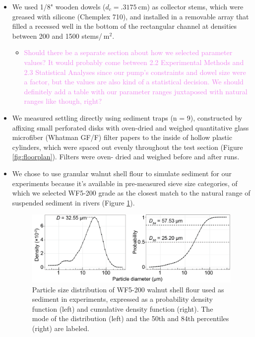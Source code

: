 \documentclass{article}
\begin{document}
\begin{itemize}
    \item We used 1/8" wooden dowels ($d_c = \SI{.3175}{\centi\metre}$) as collector stems, which were greased with silicone (Chemplex 710), and installed in a removable array that filled a recessed well in the bottom of the rectangular channel at densities between 200 and 1500 stems/$\SI{}{\metre^2}$.
    \begin{itemize}
        \item \textcolor{violet}{Should there be a separate section about how we selected parameter values? It would probably come between 2.2 Experimental Methods and 2.3 Statistical Analyses since our pump's constraints and dowel size were a factor, but the values are also kind of a statistical decision. We should definitely add a table with our parameter ranges juxtaposed with natural ranges like \cite{Fauria_2015} though, right?}
    \end{itemize}
    \item We measured settling directly using sediment traps (n = 9), constructed by affixing small perforated disks with oven-dried and weighed quantitative glass microfiber (Whatman GF/F) filter papers to the inside of hollow plastic cylinders, which were spaced out evenly throughout the test section (Figure \ref{fig:floorplan}). Filters were oven- dried and weighed before and after runs.
    \item We chose to use granular walnut shell flour to simulate sediment for our experiments because it's available in pre-measured sieve size categories, of which we selected WF5-200 grade as the closest match to the natural range of suspended sediment in rivers (Figure \ref{fig:sedsize}).
 \begin{figure}[htbp]
\includegraphics[width=15cm] {wf5-200sizedist.png}
\centering
\caption{Particle size distribution of WF5-200 walnut shell flour used as sediment in experiments, expressed as a probability density function (left) and cumulative density function (right). The mode of the distribution (left) and the 50th and 84th percentiles (right) are labeled.} 
\label{fig:sedsize}
\end{figure}
   




\end{itemize}
\end{document}
